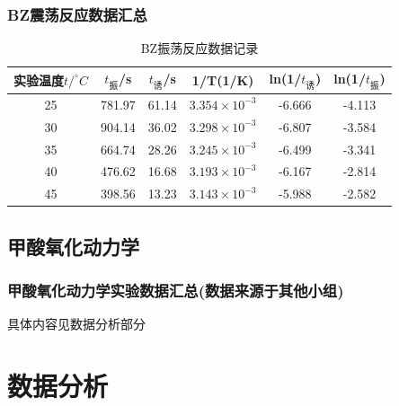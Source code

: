 \documentclass[12pt,hyperref,a4paper,UTF8]{ctexart}
\begin{document}
\begin{figure}[h]
{		\label{label_for_cross_ref_2}
	}
	\\ 
\end{figure}
\newpage
\subsubsection{BZ震荡反应数据汇总}
\begin{table}[htp]
	\centering
	\caption{BZ振荡反应数据记录}
	\begin{tabular}{|c|c|c|c|c|c|}
		\hline
		实验温度$t/^{\circ} C$ & $t_{\text{振}}$/s & $t_{\text{诱}}$/s & 1/T(1/K) & ln(1/$t_{\text{诱}}$) & ln(1/$t_{\text{振}}$) \\ \hline
		25      &  781.97  & 61.14 & $3.354\times 10^{-3}$ & -6.666 & -4.113     \\ \hline
		30      &  904.14  & 36.02 & $3.298\times 10^{-3}$ & -6.807 & -3.584         \\ \hline
		35      &  664.74  & 28.26 & $3.245\times 10^{-3}$ & -6.499 & -3.341         \\ \hline
		40      &  476.62  & 16.68 & $3.193\times 10^{-3}$ & -6.167 & -2.814         \\ \hline
		45      &  398.56  & 13.23 & $3.143\times 10^{-3}$ & -5.988 & -2.582         \\ \hline
	\end{tabular}
\end{table}
\subsection{甲酸氧化动力学}
\subsubsection{甲酸氧化动力学实验数据汇总(数据来源于其他小组)}
具体内容见数据分析部分
\newpage
\section{数据分析}
\end{document}
